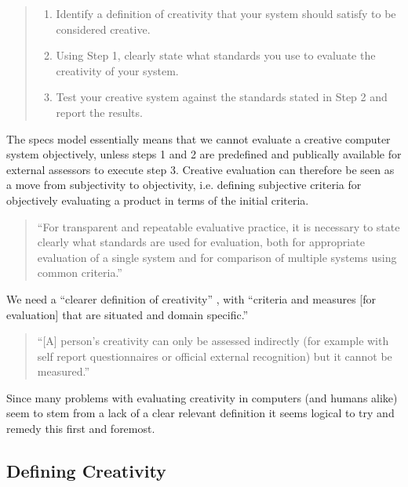 \begin{quote}
  \begin{enumerate}
    \item Identify a definition of creativity that your system should satisfy to be considered creative.
    \item Using Step 1, clearly state what standards you use to evaluate the creativity of your system.
    \item Test your creative system against the standards stated in Step 2 and report the results.
  \end{enumerate}
\end{quote}

The \gls{specs} model essentially means that we cannot evaluate a creative computer system objectively, unless steps 1 and 2 are predefined and publically available for external assessors to execute step 3. Creative evaluation can therefore be seen as a move from subjectivity to objectivity, i.e. defining subjective criteria for objectively evaluating a product in terms of the initial criteria.

\begin{quote}
  ``For transparent and repeatable evaluative practice, it is necessary to state clearly what standards are used for evaluation, both for appropriate evaluation of a single system and for comparison of multiple systems using common criteria.'' \autocite[p.67]{Jordanous2012a}
\end{quote}

We need a ``clearer definition of creativity'' \autocite[p.459]{Mayer1999}, with ``criteria and measures [for evaluation] that are situated and domain specific.'' \autocite[p.7]{Candy2012}

\begin{quote}
  ``[A] person's creativity can only be assessed indirectly (for example with self report questionnaires or official external recognition) but it cannot be measured.'' \autocite[p.258]{Piffer2012}
\end{quote}

Since many problems with evaluating creativity in computers (and humans alike) seem to stem from a lack of a clear relevant definition it seems logical to try and remedy this first and foremost.


\subsection{Defining Creativity}

